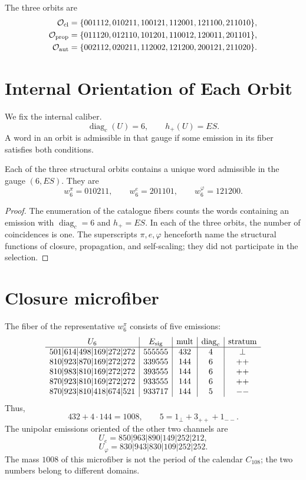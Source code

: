 The three orbits are
\begin{align*}
\mathcal O_{\rm cl}
 &=\{001112,010211,100121,112001,121100,211010\},\\
\mathcal O_{\rm prop}
 &=\{011120,012110,101201,110012,120011,201101\},\\
\mathcal O_{\rm aut}
 &=\{002112,020211,112002,121200,200121,211020\}.
\end{align*}

\section{Internal Orientation of Each Orbit}

We fix the internal caliber.
\[
 \operatorname{diag}_c(U)=6,
 \qquad h_+(U)=ES.
\]
A word in an orbit is admissible in that gauge if some emission in
its fiber satisfies both conditions.

\begin{proposition}
\label{prop:representante-orientado-unico}
Each of the three structural orbits contains a unique word
admissible in the gauge \((6,ES)\). They are
\[
 \boxed{
 w_6^\pi=010211,
 \qquad
 w_6^e=201101,
 \qquad
 w_6^\varphi=121200.}
\]
\end{proposition}

\begin{proof}
The enumeration of the catalogue fibers counts the words containing
an emission with \(\operatorname{diag}_c=6\) and \(h_+=ES\). In each of
the three orbits, the number of coincidences is one. The superscripts
\(\pi,e,\varphi\) henceforth name the structural functions of
closure, propagation, and self-scaling; they did not participate in the selection.
\end{proof}

\section{Closure microfiber}

The fiber of the representative \(w_6^\pi\) consists of five emissions:
\[
\begin{array}{c|c|c|c|c}
U_6&E_{\rm sig}&\operatorname{mult}&\operatorname{diag}_c&\text{stratum}\\\hline
501|614|498|169|272|272&555555&432&4&\perp\\
810|923|870|169|272|272&339555&144&6&++\\
810|983|810|169|272|272&393555&144&6&++\\
870|923|810|169|272|272&933555&144&6&++\\
870|923|810|418|674|521&933717&144&5&--
\end{array}
\]
Thus,
\[
 432+4\cdot144=1008,
 \qquad
 5=1_\perp+3_{++}+1_{--}.
\]
The unipolar emissions oriented of the other two channels are
\[
 U_e=850|963|890|149|252|212,
\]
\[
 U_\varphi=830|943|830|109|252|252.
\]
The mass \(1008\) of this microfiber is not the period of the calendar
\(C_{108}\); the two numbers belong to different domains.


